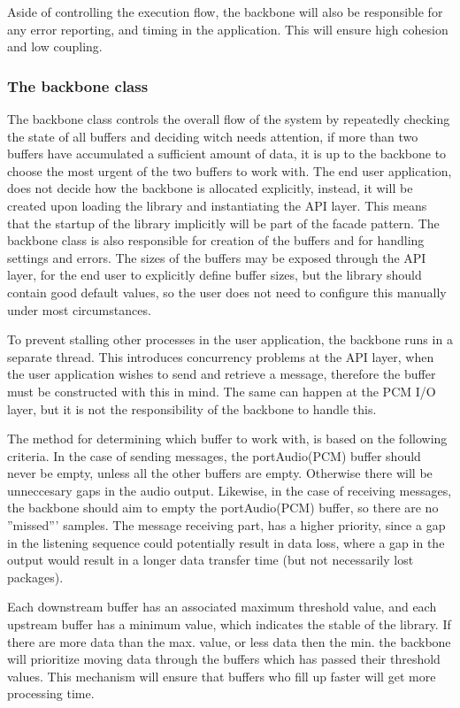 Aside of controlling the execution flow, the backbone will also be responsible for any error reporting, and timing in the application. This will ensure high cohesion and low coupling.

\subsubsection{The backbone class}
The backbone class controls the overall flow of the system by repeatedly checking the state of all buffers and deciding witch needs attention, if more than two buffers have accumulated a sufficient amount of data, it is up to the backbone to choose the most urgent of the two buffers to work with.
The end user application, does not decide how the backbone is allocated explicitly, instead, it will be created upon loading the library and instantiating the API layer. This means that the startup of the library implicitly will be part of the facade pattern.
The backbone class is also responsible for creation of the buffers and for handling settings and errors. The sizes of the buffers may be exposed through the API layer, for the end user to explicitly define buffer sizes, but the library should contain good default values, so the user does not need to configure this manually under most circumstances.

To prevent stalling other processes in the user application, the backbone runs in a separate thread. This introduces concurrency problems at the API layer, when the user application wishes to send and retrieve a message, therefore the buffer must be constructed with this in mind.
The same can happen at the PCM I/O layer, but it is not the responsibility of the backbone to handle this.

The method for determining which buffer to work with, is based on the following criteria.
In the case of sending messages, the portAudio(PCM) buffer should never be empty, unless all the other buffers are empty. Otherwise there will be unneccesary gaps in the audio output.
Likewise, in the case of receiving messages, the backbone should aim to empty the portAudio(PCM) buffer, so there are no ''missed''' samples.
The message receiving part, has a higher priority, since a gap in the listening sequence could potentially result in data loss, where a gap in the output would result in a longer data transfer time (but not necessarily lost packages).

Each downstream buffer has an associated maximum threshold value, and each upstream buffer has a minimum value, which indicates the stable of the library. If there are more data than the max. value, or less data then the min. the backbone will prioritize moving data through the buffers which has passed their threshold values. This mechanism will ensure that buffers who fill up faster will get more processing time.

